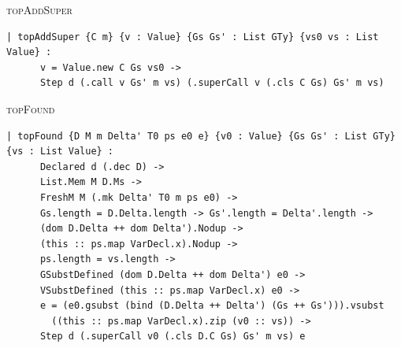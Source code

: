 \begin{cmp}{\textsc{topAddSuper}}
\begin{paperside}
\end{paperside}
\begin{leanside}
\begin{lstlisting}[style=leanside]
  | topAddSuper {C m} {v : Value} {Gs Gs' : List GTy} {vs0 vs : List Value} :
      v = Value.new C Gs vs0 ->
      Step d (.call v Gs' m vs) (.superCall v (.cls C Gs) Gs' m vs)
\end{lstlisting}
\end{leanside}
\nomapping
\end{cmp}

\begin{cmp}{\textsc{topFound}}
\begin{paperside}
\end{paperside}
\begin{leanside}
\begin{lstlisting}[style=leanside]
  | topFound {D M m Delta' T0 ps e0 e} {v0 : Value} {Gs Gs' : List GTy} {vs : List Value} :
      Declared d (.dec D) ->
      List.Mem M D.Ms ->
      FreshM M (.mk Delta' T0 m ps e0) ->
      Gs.length = D.Delta.length -> Gs'.length = Delta'.length ->
      (dom D.Delta ++ dom Delta').Nodup ->
      (this :: ps.map VarDecl.x).Nodup ->
      ps.length = vs.length ->
      GSubstDefined (dom D.Delta ++ dom Delta') e0 ->
      VSubstDefined (this :: ps.map VarDecl.x) e0 ->
      e = (e0.gsubst (bind (D.Delta ++ Delta') (Gs ++ Gs'))).vsubst
        ((this :: ps.map VarDecl.x).zip (v0 :: vs)) ->
      Step d (.superCall v0 (.cls D.C Gs) Gs' m vs) e
\end{lstlisting}
\end{leanside}
\end{cmp}

